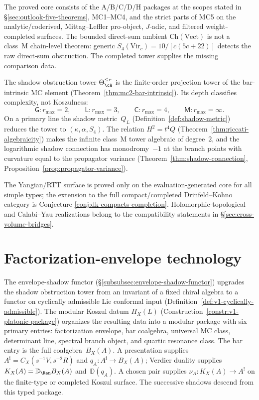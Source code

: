 The proved core consists of the A/B/C/D/H packages at the scopes
stated in \S\ref{sec:outlook-five-theorems}, MC1--MC4, and the strict parts of
MC5 on the analytic/coderived, Mittag--Leffler pro-object,
$J$-adic, and filtered weight-completed surfaces. The bounded
direct-sum ambient $\mathrm{Ch}(\mathrm{Vect})$ is not a class~M
chain-level theorem: generic
$S_4(\mathrm{Vir}_c)=10/[c(5c+22)]$ detects the raw direct-sum
obstruction. The completed tower supplies the missing comparison data.

\smallskip\noindent
The shadow obstruction tower
$\Theta_\cA^{\leq r}$ is the finite-order projection tower of the
bar-intrinsic MC element
\textup{(}Theorem~\ref{thm:mc2-bar-intrinsic}\textup{)}. Its depth
classifies complexity, not Koszulness:
\[
\mathsf G:r_{\max}=2,\qquad
\mathsf L:r_{\max}=3,\qquad
\mathsf C:r_{\max}=4,\qquad
\mathsf M:r_{\max}=\infty .
\]
On a primary line the shadow metric~$Q_L$
\textup{(}Definition~\ref{def:shadow-metric}\textup{)} reduces the
tower to $(\kappa,\alpha,S_4)$. The relation
$H^2=t^4Q$ \textup{(}Theorem~\ref{thm:riccati-algebraicity}\textup{)}
makes the infinite class~M tower algebraic of degree~$2$, and the
logarithmic shadow connection has monodromy~$-1$ at the branch
points with curvature equal to the propagator variance
\textup{(}Theorem~\ref{thm:shadow-connection},
Proposition~\ref{prop:propagator-variance}\textup{)}.

\smallskip\noindent
The Yangian/RTT surface is proved only on the
evaluation-generated core for all simple types; the extension to the
full compact/completed Drinfeld--Kohno category is Conjecture
\ref{conj:dk-compacts-completion}. Holomorphic-topological and
Calabi--Yau realizations belong to the compatibility statements in
\S\ref{sec:cross-volume-bridges}.


\section{Factorization-envelope technology}
\label{sec:concordance-nishinaka-vicedo}

The envelope-shadow functor
(\S\ref{subsubsec:envelope-shadow-functor}) upgrades the shadow
obstruction tower from an invariant of a fixed chiral algebra to a
functor on cyclically admissible Lie conformal input
(Definition~\ref{def:v1-cyclically-admissible}). The modular Koszul
datum $\Pi_X(L)$ (Construction~\ref{constr:v1-platonic-package})
organizes the resulting data into a modular package with six primary
entries: factorization envelope, bar coalgebra, universal MC class,
determinant line, spectral branch object, and quartic resonance class.
The bar entry is the full coalgebra~$B_X(A)$. A presentation supplies
$A^{\mathrm i}=C_X(s^{-1}V,s^{-2}R)$ and
$q_A\colon A^{\mathrm i}\to B_X(A)$; Verdier duality supplies
$K_X(A)=\mathbb D_{\Ran}B_X(A)$ and~$\mathbb D(q_A)$. A chosen pair
supplies $\nu_A\colon K_X(A)\to A^!$ on the finite-type or completed
Koszul surface. The successive shadows descend from this typed package.

